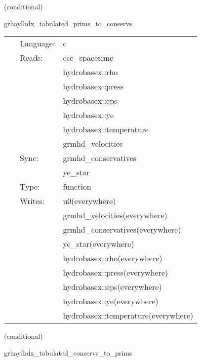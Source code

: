 \documentclass{article}
\begin{document}
\vspace{5mm}

   (conditional) 

\hspace{5mm} grhaylhdx\_tabulated\_prims\_to\_conservs 

\hspace{5mm}{\it tabulated version of grhaylhdx\_prims\_to\_conservs } 


\hspace{5mm}

 \begin{tabular*}{160mm}{cll} 
~ & Language:  & c \\ 
~ & Reads:  & ccc\_spacetime \\ 
~& ~ &hydrobasex::rho\\ 
~& ~ &hydrobasex::press\\ 
~& ~ &hydrobasex::eps\\ 
~& ~ &hydrobasex::ye\\ 
~& ~ &hydrobasex::temperature\\ 
~& ~ &grmhd\_velocities\\ 
~ & Sync:  & grmhd\_conservatives \\ 
~& ~ &ye\_star\\ 
~ & Type:  & function \\ 
~ & Writes:  & u0(everywhere) \\ 
~& ~ &grmhd\_velocities(everywhere)\\ 
~& ~ &grmhd\_conservatives(everywhere)\\ 
~& ~ &ye\_star(everywhere)\\ 
~& ~ &hydrobasex::rho(everywhere)\\ 
~& ~ &hydrobasex::press(everywhere)\\ 
~& ~ &hydrobasex::eps(everywhere)\\ 
~& ~ &hydrobasex::ye(everywhere)\\ 
~& ~ &hydrobasex::temperature(everywhere)\\ 
\end{tabular*} 


\vspace{5mm}

   (conditional) 

\hspace{5mm} grhaylhdx\_tabulated\_conservs\_to\_prims 

\hspace{5mm}{\it tabulated version of grhaylhdx\_conservs\_to\_prims } 
\end{document}
